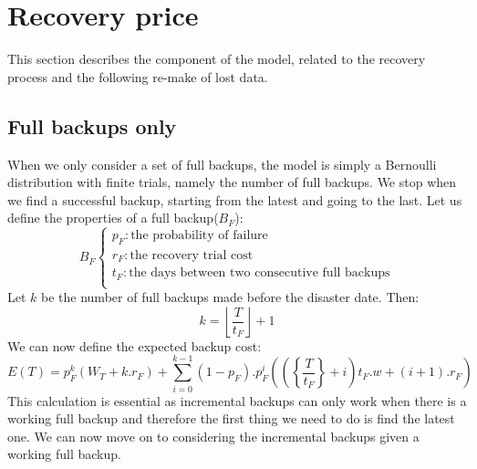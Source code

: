 \documentclass[11pt, a4paper]{article}
\theoremstyle{definition}
\begin{document}
	\section{Recovery price}
		This section describes the component of the model, related to the recovery process and the following re-make of lost data.
		\subsection{Full backups only}
		When we only consider a set of full backups, the model is simply a Bernoulli distribution with finite trials, namely the number of full backups. We stop when we find a successful backup, starting from the latest and going to the last. Let us define the properties of a full backup($B_F$):
		$$
		B_F
		\begin{cases}
			p_F: \text{the probability of failure}\\
			r_F: \text{the recovery trial cost}\\
			t_F: \text{the days between two consecutive full backups}\\
		\end{cases}
		$$
		Let $k$ be the number of full backups made before the disaster date. Then:
		$$
			k = \left \lfloor{\frac{T}{t_F}}\right \rfloor + 1
		$$
		We can now define the expected backup cost:
		\begin{equation}
		\label{eq:1}
			E(T) = p_F^{k}\left(W_T + k.r_F\right) + \displaystyle \sum_{i=0}^{k-1} (1-p_F).p_F^{i}\left( \left (\left\{ \frac{T}{t_F}\right \} + i\right)t_F.w + (i+1).r_F \right )
		\end{equation}
		This calculation is essential as incremental backups can only work when there is a working full backup and therefore the first thing we need to do is find the latest one. We can now move on to considering the incremental backups given a working full backup.
\end{document}
